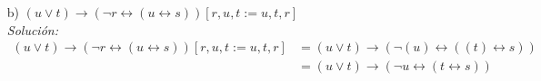 \documentclass[letterpaper,10pt]{article}
\begin{document}
\begin{enumerate}
\begin{itemize}
            \item[b)] $(u \lor t) \rightarrow 
            (\neg r \leftrightarrow (u \leftrightarrow s))[r, u, t := u, t, r]$ \\
            \textit{Solución:}
            \begin{align*}
                (u \lor t) \rightarrow (\neg r \leftrightarrow (u \leftrightarrow s))
                [r, u, t := u, t, r]
                &= (u \lor t) \rightarrow (\neg (u) \leftrightarrow ((t) \leftrightarrow s)) \\
                &= (u \lor t) \rightarrow (\neg u \leftrightarrow (t \leftrightarrow s))
            \end{align*}

        \end{itemize}


\end{enumerate}
\end{document}
